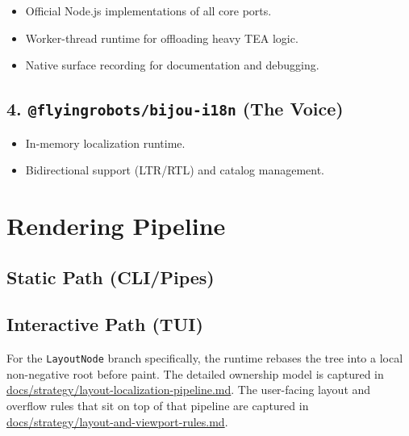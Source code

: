 \begin{itemize}
\tightlist
\item
  Official Node.js implementations of all core ports.
\item
  Worker-thread runtime for offloading heavy TEA logic.
\item
  Native surface recording for documentation and debugging.
\end{itemize}

\subsection{\texorpdfstring{4. \texttt{@\allowbreak{}f\allowbreak{}l\allowbreak{}y\allowbreak{}i\allowbreak{}n\allowbreak{}g\allowbreak{}r\allowbreak{}o\allowbreak{}b\allowbreak{}o\allowbreak{}t\allowbreak{}s\allowbreak{}/\allowbreak{}b\allowbreak{}i\allowbreak{}j\allowbreak{}o\allowbreak{}u\allowbreak{}-\allowbreak{}i\allowbreak{}1\allowbreak{}8\allowbreak{}n} (The Voice)}{4.  (The Voice)}}\label{record-003-flyingrobotsbijou-i18n-the-voice}

\begin{itemize}
\tightlist
\item
  In-memory localization runtime.
\item
  Bidirectional support (LTR/RTL) and catalog management.
\end{itemize}

\section{Rendering Pipeline}\label{record-003-rendering-pipeline}

\subsection{Static Path (CLI/Pipes)}\label{record-003-static-path-clipipes}



\subsection{Interactive Path (TUI)}\label{record-003-interactive-path-tui}



For the \texttt{L\allowbreak{}a\allowbreak{}y\allowbreak{}o\allowbreak{}u\allowbreak{}t\allowbreak{}N\allowbreak{}o\allowbreak{}d\allowbreak{}e} branch specifically, the runtime rebases the tree into a local non-negative root before paint. The detailed ownership model is captured in \href{https://github.com/flyingrobots/bijou/blob/cbd70612140e7a450d764b3c7be1c6af878b99bc/docs/strategy/layout-localization-pipeline.md}{docs/strategy/layout-localization-pipeline.md}. The user-facing layout and overflow rules that sit on top of that pipeline are captured in \href{https://github.com/flyingrobots/bijou/blob/cbd70612140e7a450d764b3c7be1c6af878b99bc/docs/strategy/layout-and-viewport-rules.md}{docs/strategy/layout-and-viewport-rules.md}.

